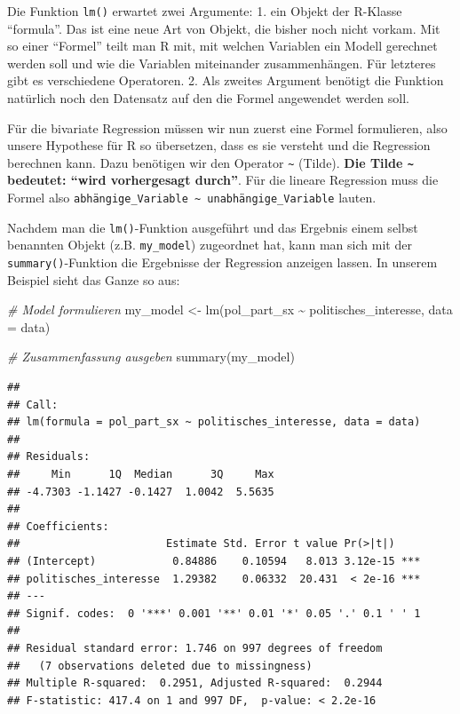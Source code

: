 \documentclass[
]{book}
\newenvironment{Shaded}{\begin{snugshade}}{\end{snugshade}}
\newcommand{\AttributeTok}[1]{\textcolor[rgb]{0.77,0.63,0.00}{#1}}
\newcommand{\CommentTok}[1]{\textcolor[rgb]{0.56,0.35,0.01}{\textit{#1}}}
\newcommand{\FunctionTok}[1]{\textcolor[rgb]{0.00,0.00,0.00}{#1}}
\newcommand{\NormalTok}[1]{#1}
\newcommand{\OtherTok}[1]{\textcolor[rgb]{0.56,0.35,0.01}{#1}}
\newcommand{\SpecialCharTok}[1]{\textcolor[rgb]{0.00,0.00,0.00}{#1}}
\begin{document}
Die Funktion \texttt{lm()} erwartet zwei Argumente: 1. ein Objekt der R-Klasse ``formula''. Das ist eine neue Art von Objekt, die bisher noch nicht vorkam. Mit so einer ``Formel'' teilt man R mit, mit welchen Variablen ein Modell gerechnet werden soll und wie die Variablen miteinander zusammenhängen. Für letzteres gibt es verschiedene Operatoren. 2. Als zweites Argument benötigt die Funktion natürlich noch den Datensatz auf den die Formel angewendet werden soll.

Für die bivariate Regression müssen wir nun zuerst eine Formel formulieren, also unsere Hypothese für R so übersetzen, dass es sie versteht und die Regression berechnen kann. Dazu benötigen wir den Operator \texttt{\textasciitilde{}} (Tilde). \textbf{Die Tilde \texttt{\textasciitilde{}} bedeutet: ``wird vorhergesagt durch''}. Für die lineare Regression muss die Formel also \texttt{abhängige\_Variable\ \textasciitilde{}\ unabhängige\_Variable} lauten.

Nachdem man die \texttt{lm()}-Funktion ausgeführt und das Ergebnis einem selbst benannten Objekt (z.B. \texttt{my\_model}) zugeordnet hat, kann man sich mit der \texttt{summary()}-Funktion die Ergebnisse der Regression anzeigen lassen. In unserem Beispiel sieht das Ganze so aus:

\begin{Shaded}
\begin{Highlighting}[]
\CommentTok{\# Model formulieren}
\NormalTok{my\_model }\OtherTok{\textless{}{-}} \FunctionTok{lm}\NormalTok{(pol\_part\_sx }\SpecialCharTok{\textasciitilde{}}\NormalTok{ politisches\_interesse, }\AttributeTok{data =}\NormalTok{ data)}
  
\CommentTok{\# Zusammenfassung ausgeben}
\FunctionTok{summary}\NormalTok{(my\_model)}
\end{Highlighting}
\end{Shaded}

\begin{verbatim}
## 
## Call:
## lm(formula = pol_part_sx ~ politisches_interesse, data = data)
## 
## Residuals:
##     Min      1Q  Median      3Q     Max 
## -4.7303 -1.1427 -0.1427  1.0042  5.5635 
## 
## Coefficients:
##                       Estimate Std. Error t value Pr(>|t|)    
## (Intercept)            0.84886    0.10594   8.013 3.12e-15 ***
## politisches_interesse  1.29382    0.06332  20.431  < 2e-16 ***
## ---
## Signif. codes:  0 '***' 0.001 '**' 0.01 '*' 0.05 '.' 0.1 ' ' 1
## 
## Residual standard error: 1.746 on 997 degrees of freedom
##   (7 observations deleted due to missingness)
## Multiple R-squared:  0.2951, Adjusted R-squared:  0.2944 
## F-statistic: 417.4 on 1 and 997 DF,  p-value: < 2.2e-16
\end{verbatim}
\end{document}
